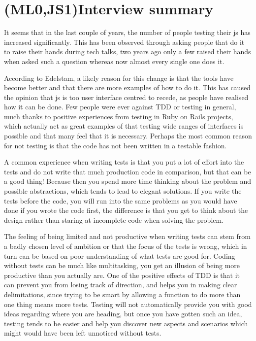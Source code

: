 \documentclass[11pt]{article}
\begin{document}
\section{(ML0,JS1)Interview summary}

It seems that in the last couple of years, the number of people testing their \gls{js} has increased significantly\cite[question~1]{Edelstam}. This has been observed through asking people that do it to raise their hands during tech talks, two years ago only a few raised their hands when asked such a question whereas now almost every single one does it.

According to Edelstam, a likely reason for this change is that the tools have become better and that there are more examples of how to do it. This has caused the opinion that \gls{js} is too user interface centred to recede, as people have realised how it can be done. Few people were ever against TDD or testing in general, much thanks to positive experiences from testing in Ruby on Rails projects, which actually act as great examples of that testing wide ranges of interfaces is possible and that many feel that it is necessary. Perhaps the most common reason for not testing is that the code has not been written in a testable fashion. \cite[questions~2-3]{Edelstam}

A common experience when writing tests is that you put a lot of effort into the tests and do not write that much production code in comparison, but that can be a good thing! Because then you spend more time thinking about the problem and possible abstractions, which tends to lead to elegant solutions. If you write the tests before the code, you will run into the same problems as you would have done if you wrote the code first, the difference is that you get to think about the design rather than staring at incomplete code when solving the problem. \cite[question~8]{Edelstam}

The feeling of being limited and not productive when writing tests can stem from a badly chosen level of ambition or that the focus of the tests is wrong, which in turn can be based on poor understanding of what tests are good for. Coding without tests can be much like multitasking, you get an illusion of being more productive than you actually are. One of the positive effects of TDD is that it can prevent you from losing track of direction, and helps you in making clear delimitations, since trying to be smart by allowing a function to do more than one thing means more tests. Testing will not automatically provide you with good ideas regarding where you are heading, but once you have gotten such an idea, testing tends to be easier and help you discover new aspects and scenarios which might would have been left unnoticed without tests. \cite[question~8]{Edelstam}
\end{document}
